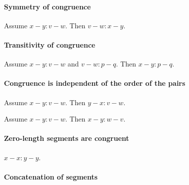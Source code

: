 \documentclass{article}
\begin{document}
  \paragraph{Symmetry of congruence}

  \begin{forthel}
    \begin{lemma}[L2o2]
      Assume $x-y : v-w$. Then $v-w : x-y$.
    \end{lemma}
  \end{forthel}


  \paragraph{Transitivity of congruence}

  \begin{forthel}
    \begin{lemma}[L2o3]
      Assume $x-y : v-w$ and $v-w : p-q$. Then $x-y : p-q$.
    \end{lemma}
  \end{forthel}


  \paragraph{Congruence is independent of the order of the pairs}

  \begin{forthel}
    \begin{lemma}[L2o4]
      Assume $x-y : v-w$. Then $y-x : v-w$.
    \end{lemma}

    \begin{lemma}[L2o5]
      Assume $x-y : v-w$. Then $x-y : w-v$.
    \end{lemma}
  \end{forthel}


  \paragraph{Zero-length segments are congruent}

  \begin{forthel}
    \begin{lemma}[L2o8]
      $x-x : y-y$.
    \end{lemma}
  \end{forthel}


  \paragraph{Concatenation of segments}
\end{document}
